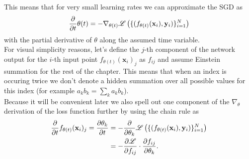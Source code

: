 This means that for very small learning rates we can approximate the SGD as 
\begin{equation}\label{eq:NTKThetaDerivative}
	\frac{\partial}{\partial t}\theta(t) = - \nabla_{\theta(t)} \mathscr{L}\left( \{(f_{\theta(t)}(\mathbf{x}_i), \mathbf{y}_i)\}_{i=1}^{N} \right)
\end{equation}
with the partial derivative of $\theta$ along the assumed time variable.\\
For visual simplicity reasons, let's define the $j$-th component of the network output for the $i$-th input point $f_{\theta(t)}(\mathbf{x}_i)_j$ as $f_{ij}$ and assume Einstein summation for the rest of the chapter.
This means that when an index is occuring twice we don't denote a hidden summation over all possible values for this index (for example $a_kb_k = \sum_k a_kb_k$).\\
Because it will be convenient later we also spell out one component of the $\nabla_\theta$ derivation of the loss function further by using the chain rule as
\begin{align}
	\frac{\partial}{\partial t}f_{\theta(t)}(\mathbf{x}_i)_j = \frac{\partial\theta_k}{\partial t} &= - \frac{\partial}{\partial\theta_k}\mathscr{L}\left( \{(f_{\theta(t)}(\mathbf{x}_i), \mathbf{y}_i)\}_{i=1}^{N} \right)\nonumber\\
	&= - \frac{\partial\mathscr{L}}{\partial f_{ij}} \cdot \frac{\partial f_{ij}}{\partial\theta_k}.
\end{align} 

